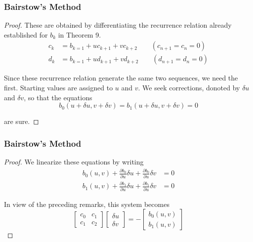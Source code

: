 \documentclass[notheorems,mathserif,table,compress]{beamer}  %
\begin{document}
\begin{frame}
\frametitle{Bairstow's Method}
\begin{proof}
These are obtained by differentiating the recurrence relation already established for $b_k$ in Theorem 9.
\begin{equation*}
\begin{split}
c_k&=b_{k=1}+uc_{k+1}+vc_{k+2} \qquad(c_{n+1}=c_n=0)\\
d_k&=b_{k=1}+ud_{k+1}+vd_{k+2} \qquad(d_{n+1}=d_n=0)
\end{split}
\end{equation*}

Since these recurrence relation generate the same two sequences, we need the first. Starting values are assigned to $u$ and $v$. We seek corrections, donoted by $\delta u$ and $\delta v$, so that the equations 
\begin{displaymath}
b_0(u+\delta u,v+\delta v)=b_1(u+\delta u,v+\delta v)=0
\end{displaymath}

are sure.
\end{proof}
\end{frame}

\begin{frame}
\frametitle{Bairstow's Method}
\begin{proof}
We linearize these equations by writing
\begin{equation*}
\begin{split}
b_0(u,v)+\frac{\partial b_0}{\partial u}\delta u +\frac{\partial b_0}{\partial u}\delta v&=0\\
b_1(u,v)+\frac{\partial b_1}{\partial u}\delta u +\frac{\partial b_1}{\partial u}\delta v&=0
\end{split}
\end{equation*}

In view of the preceding remarks, this system becomes
\begin{displaymath}
\begin{bmatrix}
c_0 & c_1 \\
c_1 & c_2 
\end{bmatrix}
\begin{bmatrix}
\delta u\\
\delta v
\end{bmatrix}
=-\begin{bmatrix}
b_0(u,v) \\
b_1(u,v)
\end{bmatrix}
\end{displaymath}

\end{proof}
\end{frame}
\end{document}
